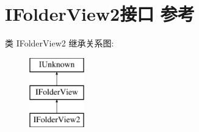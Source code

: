\hypertarget{interface_i_folder_view2}{}\section{I\+Folder\+View2接口 参考}
\label{interface_i_folder_view2}
类 I\+Folder\+View2 继承关系图\+:\begin{figure}[H]
\begin{center}
\leavevmode
\includegraphics[height=3.000000cm]{interface_i_folder_view2}
\end{center}
\end{figure}

